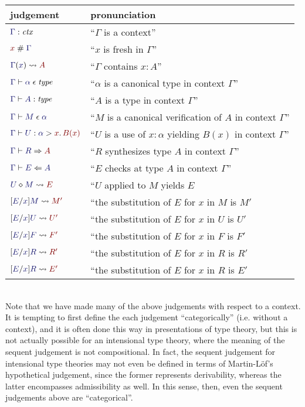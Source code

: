 \documentclass[main.tex]{subfiles}
\begin{document}
\begin{tabular}{ll}
  \toprule
  judgement & pronunciation\\ \midrule
  $\lfctx{\Gamma}$ & ``$\Gamma$ is a context''\\
  $\fresh{x}{\Gamma}$ & ``$x$ is fresh in $\Gamma$''\\
  $\hasvar{\Gamma}{x}{A}$ & ``$\Gamma$ contains $x:A$''\\
  $\lfsequent\Gamma\cantype{\alpha}$ & ``$\alpha$ is a canonical type in context $\Gamma$''\\
  $\lfsequent\Gamma\type{A}$ & ``$A$ is a type in context $\Gamma$''\\
  $\lfsequent\Gamma\valof{M}{\alpha}$ & ``$M$ is a canonical verification of $A$ in context $\Gamma$''\\
  $\lfsequent\Gamma\useof{U}{\alpha}{x}{B(x)}$ & ``$U$ is a use of $x:\alpha$ yielding $B(x)$ in context $\Gamma$''\\
  $\lfsequent\Gamma\infers{R}{A}$ & ``$R$ synthesizes type $A$ in context $\Gamma$''\\
  $\lfsequent\Gamma\checks{E}{A}$ & ``$E$ checks at type $A$ in context $\Gamma$''\\
  $\eapply{U}{M}{E}$ & ``$U$ applied to $M$ yields $E$\\
  $\hsubste{E}{x}{M}{M'}$ & ``the substitution of $E$ for $x$ in $M$ is $M'$\\
  $\hsubstu{E}{x}{U}{U'}$ & ``the substitution of $E$ for $x$ in $U$ is $U'$\\
  $\hsubste{E}{x}{F}{F'}$ & ``the substitution of $E$ for $x$ in $F$ is $F'$\\
  $\hsubstr{E}{x}{R}{R'}$ & ``the substitution of $E$ for $x$ in $R$ is $R'$\\
  $\hsubstrm{E}{x}{R}{E'}$ & ``the substitution of $E$ for $x$ in $R$ is $E'$\\
  \bottomrule
\end{tabular}\\

Note that we have made many of the above judgements with respect to a
context. It is tempting to first define the each judgement
``categorically'' (i.e. without a context), and it is often done this
way in presentations of type theory,
but this is not actually possible for an intensional type theory, where the
meaning of the sequent judgement is not compositional. In fact, the
sequent judgement for intensional type theories may not even be
defined in terms of Martin-L\"of's hypothetical judgement, since the
former represents derivability, whereas the latter encompasses
admissibility as well. In this sense, then, even the sequent
judgements above are ``categorical''.
\end{document}
